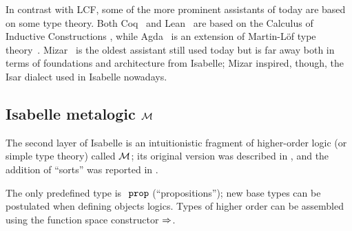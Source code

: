 In contrast with LCF, some of the more prominent assistants of today are
based on some type theory. Both Coq~\cite{coq} and
Lean~\cite{DBLP:conf/cade/Moura021} are based on the Calculus of
Inductive Constructions
\cite{DBLP:conf/mfps/PfenningP89,DBLP:journals/iandc/CoquandH88},
while Agda~\cite{agda} is an extension of Martin-Löf type
theory~\cite{DBLP:books/daglib/0000395}. Mizar~\cite{mizar} is the
oldest assistant still used today but is far away both in terms of
foundations and architecture from Isabelle; Mizar inspired, though, the
Isar dialect used in Isabelle nowadays.




\subsection{Isabelle metalogic $\mathcal{M}$}
\label{sec:isabelle-metalogic-meta}

The second layer of Isabelle is an
intuitionistic fragment of higher-order logic (or simple type theory)
called $\mathcal{M}$; its original version was described in \cite{Paulson1989},
and the addition of “sorts” was reported in \cite{Nipkow-LF-91}.

The only predefined type is $\prop$ (“propositions”); new base types
can be postulated when defining objects logics. Types of higher order can be
assembled using the function space constructor $\Rightarrow$.

